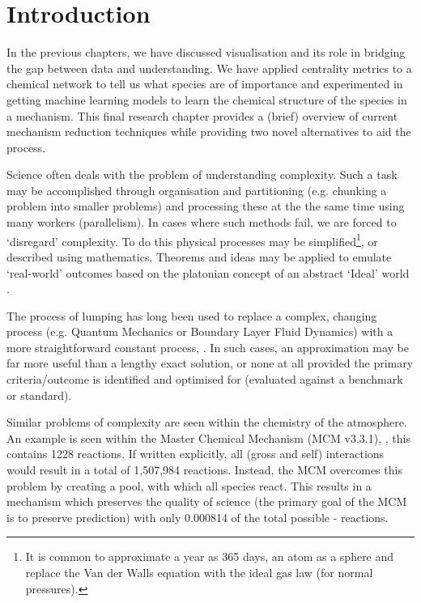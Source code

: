 

\section{Introduction}

In the previous chapters, we have discussed visualisation and its role in bridging the gap between data and understanding. We have applied centrality metrics to a chemical network to tell us what species are of importance and experimented in getting machine learning models to learn the chemical structure of the species in a mechanism. This final research chapter provides a (brief) overview of current mechanism reduction techniques while providing two novel alternatives to aid the process.

Science often deals with the problem of understanding complexity. Such a task may be accomplished through organisation and partitioning (e.g. chunking a problem into smaller problems) and processing these at the the same time using many workers (parallelism). In cases where such methods fail, we are forced to `disregard' complexity. To do this physical processes may be simplified\footnote{It is common to approximate a year as 365 days, an atom as a sphere and replace the Van der Walls equation with the ideal gas law (for normal pressures).}, or described using mathematics. Theorems and ideas may be applied to emulate `real-world' outcomes based on the platonian concept of an abstract `Ideal' world \citep{platoform, physapprox}.

 The process of lumping has long been used to replace a complex, changing process (e.g. Quantum Mechanics or Boundary Layer Fluid Dynamics) with a more straightforward constant process, \citep{approx}. In such cases, an approximation may be far more useful than a lengthy exact solution, or none at all provided the primary criteria/outcome is identified and optimised for (evaluated against a benchmark or standard).

Similar problems of complexity are seen within the chemistry of the atmosphere. An example is seen within the Master Chemical Mechanism (MCM v3.3.1), \citep{mcm}, this contains 1228  reactions. If written explicitly, all  (gross and self) interactions would result in a total of 1,507,984 reactions. Instead, the MCM overcomes this problem by creating a  pool, with which all  species react. This results in a mechanism which preserves the quality of science (the primary goal of the MCM is to preserve  prediction) with only 0.000814 of the total possible  -  reactions.


